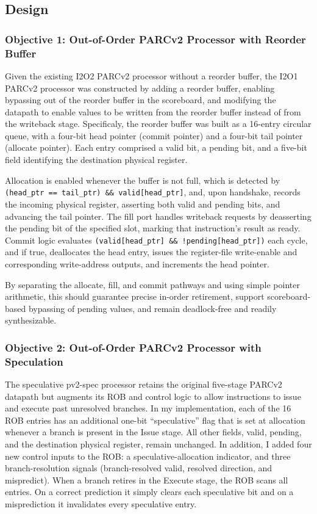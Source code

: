 \documentclass[11pt]{article}
\begin{document}
\subsection*{Design}

\subsubsection*{Objective 1: Out-of-Order PARCv2 Processor with Reorder Buffer}

Given the existing I2O2 PARCv2 processor without a reorder buffer, 
the I2O1 PARCv2 processor was constructed by adding a reorder buffer, 
enabling bypassing out of the reorder buffer in the scoreboard, and
modifying the datapath to enable values to be written from the reorder buffer instead
of from the writeback stage. Specificaly, the reorder buffer was built as a 
16-entry circular queue, with
a four-bit head pointer (commit pointer) and a four-bit tail pointer (allocate
pointer). Each entry comprised a valid bit, a pending bit, and a five-bit field
identifying the destination physical register. 

Allocation is enabled whenever the buffer is not full, which is detected by \texttt{(head\_ptr ==
tail\_ptr) \&\& valid[head\_ptr]}, and, upon handshake, records the incoming
physical register, asserting both valid and pending bits, and advancing the tail
pointer. The fill port handles writeback requests
by deasserting the pending bit of the specified slot, marking that
instruction’s result as ready. Commit logic evaluates \texttt{(valid[head\_ptr] \&\&
!pending[head\_ptr])} each cycle, and if true, deallocates the head entry, issues
the register-file write-enable and corresponding write-address outputs, and
increments the head pointer.

By separating the allocate, fill, and commit pathways and using simple
pointer arithmetic, this should guarantee precise in-order retirement,
support scoreboard‐based bypassing of pending values, and remain 
deadlock-free and readily synthesizable.

\subsubsection*{Objective 2: Out-of-Order PARCv2 Processor with Speculation}

The speculative pv2-spec processor retains the original five-stage PARCv2
datapath but augments its ROB and control logic to allow
instructions to issue and execute past unresolved branches. In my 
implementation, each of the 16 ROB entries has an additional one-bit “speculative” flag
that is set at allocation whenever a branch is present in the Issue stage. All
other fields, valid, pending, and the destination physical register, remain
unchanged. In addition, I added four new control inputs to the ROB: a
speculative-allocation indicator, and three branch-resolution signals
(branch-resolved valid, resolved direction, and mispredict). When a branch
retires in the Execute stage, the ROB scans all entries. On a correct
prediction it simply clears each speculative bit and on a misprediction it
invalidates every speculative entry. 
\end{document}
